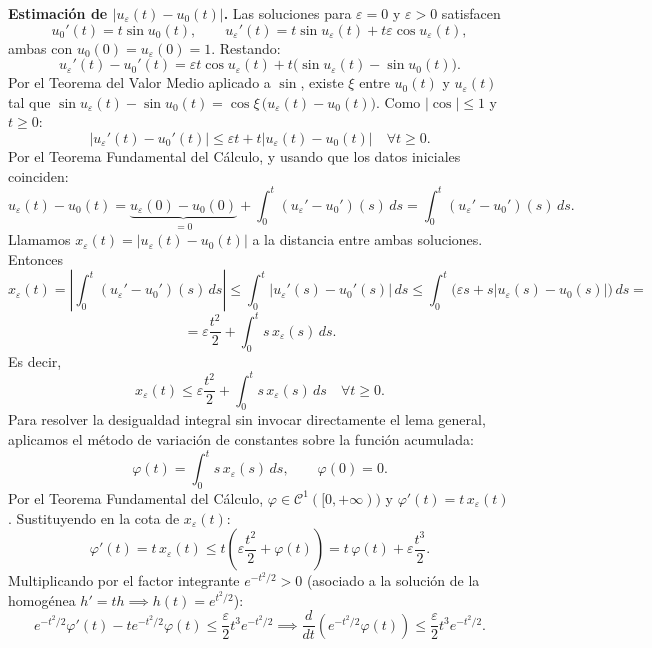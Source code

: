{    \textbf{Estimación de $|u_\varepsilon(t) - u_0(t)|$.} Las soluciones para $\varepsilon = 0$ y $\varepsilon > 0$ satisfacen
    \[
        u_0'(t) = t \sin u_0(t), \qquad u_\varepsilon'(t) = t \sin u_\varepsilon(t) + t \varepsilon \cos u_\varepsilon(t),
    \]
    ambas con $u_0(0) = u_\varepsilon(0) = 1$. Restando:
    \[
        u_\varepsilon'(t) - u_0'(t) = \varepsilon t \cos u_\varepsilon(t) + t \big( \sin u_\varepsilon(t) - \sin u_0(t) \big).
    \]
    Por el Teorema del Valor Medio aplicado a $\sin$, existe $\xi$ entre $u_0(t)$ y $u_\varepsilon(t)$ tal que $\sin u_\varepsilon(t) - \sin u_0(t) = \cos \xi \, \big( u_\varepsilon(t) - u_0(t) \big)$. Como $|\cos| \le 1$ y $t \ge 0$:
    \[
        |u_\varepsilon'(t) - u_0'(t)| \le \varepsilon t + t |u_\varepsilon(t) - u_0(t)| \quad \forall t \ge 0.
    \]
    Por el Teorema Fundamental del Cálculo, y usando que los datos iniciales coinciden:
    \[
        u_\varepsilon(t) - u_0(t) = \underbrace{u_\varepsilon(0) - u_0(0)}_{= 0} + \int_0^t (u_\varepsilon' - u_0')(s) \, ds = \int_0^t (u_\varepsilon' - u_0')(s) \, ds.
    \]
    Llamamos $x_\varepsilon(t) = |u_\varepsilon(t) - u_0(t)|$ a la distancia entre ambas soluciones. Entonces
    \[
        x_\varepsilon(t) = \left| \int_0^t (u_\varepsilon' - u_0')(s) \, ds \right| \le \int_0^t |u_\varepsilon'(s) - u_0'(s)| \, ds \le \int_0^t \big( \varepsilon s + s |u_\varepsilon(s) - u_0(s)| \big) \, ds =
    \]
    \[
        = \varepsilon \frac{t^2}{2} + \int_0^t s \, x_\varepsilon(s) \, ds.
    \]
    Es decir,
    \[
        x_\varepsilon(t) \le \varepsilon \frac{t^2}{2} + \int_0^t s \, x_\varepsilon(s) \, ds \quad \forall t \ge 0.
    \]
        Para resolver la desigualdad integral sin invocar directamente el lema general, aplicamos el método de variación de constantes sobre la función acumulada:
    \[
        \varphi(t) = \int_0^t s \, x_\varepsilon(s) \, ds, \qquad \varphi(0) = 0.
    \]
    Por el Teorema Fundamental del Cálculo, $\varphi \in \mathcal{C}^1([0, +\infty))$ y $\varphi'(t) = t \, x_\varepsilon(t)$. Sustituyendo en la cota de $x_\varepsilon(t)$:
    \[
        \varphi'(t) = t \, x_\varepsilon(t) \le t \left( \varepsilon \frac{t^2}{2} + \varphi(t) \right) = t \, \varphi(t) + \varepsilon \frac{t^3}{2}.
    \]
    Multiplicando por el factor integrante $e^{-t^2/2} > 0$ (asociado a la solución de la homogénea $h' = th \implies h(t) = e^{t^2/2}$):
    \[
        e^{-t^2/2} \varphi'(t) - t e^{-t^2/2} \varphi(t) \le \frac{\varepsilon}{2} t^3 e^{-t^2/2} \implies \frac{d}{dt} \left( e^{-t^2/2} \varphi(t) \right) \le \frac{\varepsilon}{2} t^3 e^{-t^2/2}.
\]}
